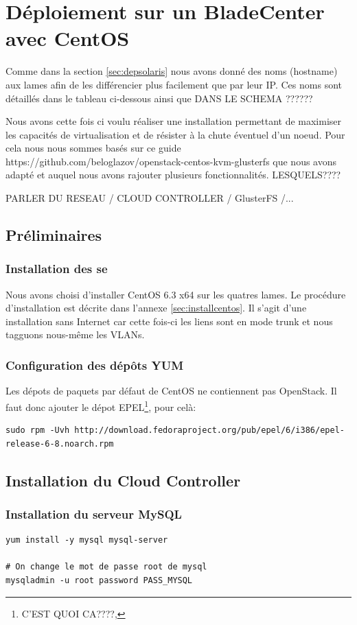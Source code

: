 \documentclass[a4paper,oneside]{report}
\begin{document}
\section{Déploiement sur un BladeCenter avec CentOS}
Comme dans la section \ref{sec:depsolaris} nous avons donné des noms (hostname) aux lames afin de les différencier plus facilement que par leur IP.
Ces noms sont détaillés dans le tableau ci-dessous ainsi que DANS LE SCHEMA ??????

Nous avons cette fois ci voulu réaliser une installation permettant de maximiser les capacités de virtualisation et de résister à la chute éventuel d'un noeud.
Pour cela nous nous sommes basés sur ce guide https://github.com/beloglazov/openstack-centos-kvm-glusterfs que nous avons adapté et auquel nous avons rajouter plusieurs fonctionnalités. LESQUELS????

PARLER DU RESEAU / CLOUD CONTROLLER / GlusterFS /...

\subsection{Préliminaires}
\subsubsection{Installation des \gls{se}}
Nous avons choisi d'installer CentOS 6.3 x64 sur les quatres lames. Le procédure d'installation est décrite dans l'annexe \ref{sec:installcentos}.\newline
Il s'agit d'une installation sans Internet car cette fois-ci les liens sont en mode trunk et nous tagguons nous-même les VLANs.

\subsubsection{Configuration des dépôts YUM}
Les dépots de paquets par défaut de CentOS ne contiennent pas OpenStack. Il faut donc ajouter le dépot EPEL\footnote{C'EST QUOI CA????,}, pour celà:
\begin{verbatim}
sudo rpm -Uvh http://download.fedoraproject.org/pub/epel/6/i386/epel-release-6-8.noarch.rpm
\end{verbatim}

\subsection{Installation du Cloud Controller}
\subsubsection{Installation du serveur MySQL}
\begin{verbatim}
yum install -y mysql mysql-server

# On change le mot de passe root de mysql
mysqladmin -u root password PASS_MYSQL
\end{verbatim}
\end{document}
